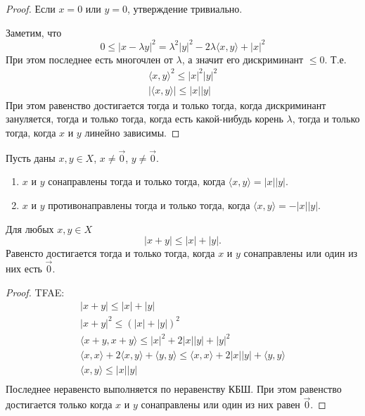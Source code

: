 \documentclass[12pt,a4paper]{article}
\begin{document}
    \begin{proof}
        Если $x = 0$ или $y = 0$, утверждение тривиально.

        Заметим, что
        \[0 \leqslant |x - \lambda y|^2 = \lambda^2 |y|^2 - 2 \lambda \langle x, y \rangle + |x|^2\]
        При этом последнее есть многочлен от $\lambda$, а значит его дискриминант $\leqslant 0$. Т.е.
        \begin{gather*}
            \langle x, y \rangle^2 \leqslant |x|^2 |y|^2\\
            |\langle x, y \rangle| \leqslant |x| |y|
        \end{gather*}
        При этом равенство достигается тогда и только тогда, когда дискриминант зануляется, тогда и только тогда, когда есть какой-нибудь корень $\lambda$, тогда и только тогда, когда $x$ и $y$ линейно зависимы.
    \end{proof}

    \begin{corollary}
        Пусть даны $x, y \in X$, $x \neq \vec{0}$, $y \neq \vec{0}$.
        \begin{enumerate}
            \item $x$ и $y$ сонаправлены тогда и только тогда, когда $\langle x, y \rangle = |x||y|$.
            \item $x$ и $y$ противонаправлены тогда и только тогда, когда $\langle x, y \rangle = -|x||y|$.
        \end{enumerate}
    \end{corollary}

    \begin{corollary}
        Для любых $x, y \in X$
        \[|x + y| \leqslant |x| + |y|.\]
        Равенсто достигается тогда и только тогда, когда $x$ и $y$ сонаправлены или один из них есть $\vec{0}$.
    \end{corollary}

    \begin{proof}
        TFAE:
        \begin{gather*}
            |x + y| \leqslant |x| + |y|\\
            |x + y|^2 \leqslant (|x| + |y|)^2\\
            \langle x + y, x + y \rangle \leqslant |x|^2 + 2|x||y| + |y|^2\\
            \langle x, x \rangle + 2\langle x, y \rangle + \langle y, y \rangle \leqslant \langle x, x \rangle + 2|x||y| + \langle y, y \rangle\\
            \langle x, y \rangle \leqslant |x||y|\\
        \end{gather*}
        Последнее неравенсто выполняется по неравенству КБШ. При этом равенство достигается только когда $x$ и $y$ сонаправлены или один из них равен $\vec{0}$.
    \end{proof}
\end{document}
